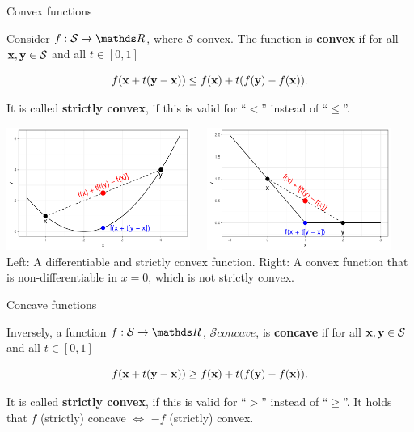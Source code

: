 \begin{vbframe}{Convex functions}

Consider $f: \mathcal{S} \to \R$, where $\mathcal{S}$ convex. The function is \textbf{convex} if for all $\mathbf{x}, \mathbf{y} \in \mathcal{S}$ and all $t \in [0, 1]$

$$
f(\mathbf{x} + t(\mathbf{y} - \mathbf{x})) \le f(\mathbf{x}) + t(f(\mathbf{y}) - f(\mathbf{x})).
$$

It is called \textbf{strictly convex}, if this is valid for \enquote{$<$} instead of \enquote{$\le$}.

\begin{center}
\includegraphics[width = 0.45\textwidth, keepaspectratio]{figure_man/convexity_1.pdf}~~~\includegraphics[width = 0.45\textwidth, keepaspectratio]{figure_man/convexity_2.pdf} \\
\footnotesize{Left: A differentiable and strictly convex function. Right: A convex function that is non-differentiable in $x = 0$, which is not strictly convex. }
\end{center}

\end{vbframe}

\begin{vbframe}{Concave functions}

    Inversely, a function $f: \mathcal{S} \to \R$, $\mathcal{S} concave$, is \textbf{concave} if for all $\mathbf{x}, \mathbf{y} \in \mathcal{S}$ and all $t \in [0, 1]$

    $$
    f(\mathbf{x} + t(\mathbf{y} - \mathbf{x})) \ge f(\mathbf{x}) + t(f(\mathbf{y}) - f(\mathbf{x})).
    $$

    It is called \textbf{strictly convex}, if this is valid for \enquote{$>$} instead of \enquote{$\ge$}.
    It holds that
    $f$ (strictly) concave $\Leftrightarrow$ $-f$ (strictly) convex.

\end{vbframe}

